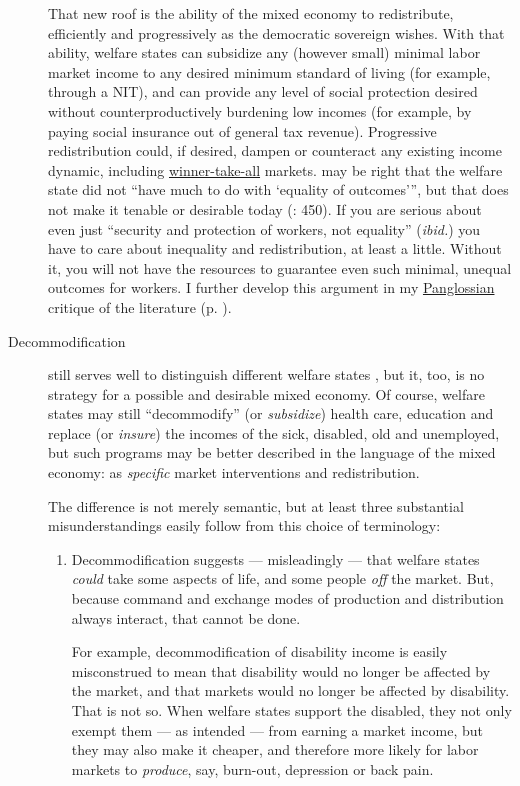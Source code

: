 \begin{description}
	That new roof is the ability of the mixed economy to redistribute, efficiently and progressively as the democratic sovereign wishes. With that ability, welfare states can subsidize any (however small) minimal labor market income to any desired minimum standard of living (for example, through a \gls{NIT}), and can provide any level of social protection desired without counterproductively burdening low incomes (for example, by paying social insurance out of general tax revenue). Progressive redistribution could, if desired, dampen or counteract any existing income dynamic, including \hyperref[sec:winner-take-all]{winner-take-all} markets. \citeauthor{Offe2003} may be right that the welfare state did not ``have much to do with `equality of outcomes''', but that does not make it tenable or desirable today (\citeyear{Offe2003}: 450). If you are serious about even just ``security and protection of workers, not equality'' (\emph{ibid.}) you have to care about inequality and redistribution, at least a little. Without it, you will not have the resources to guarantee even such minimal, unequal outcomes for workers. I further develop this argument  in my \hyperref[sec:Pangloss]{Panglossian} critique of the literature (p. \pageref{sec:Pangloss}).

	\item[Decommodification] still serves well to distinguish different welfare states \citep{Esping-Andersen-1990-aa}, but it, too, is no strategy for a possible and desirable mixed economy.  Of course, welfare states may still ``decommodify'' (or \emph{subsidize}) health care, education and replace (or \emph{insure}) the incomes of the sick, disabled, old and unemployed, but such programs may be better described in the language of the mixed economy: as \emph{specific} market interventions and redistribution. 
	
	The difference is not merely semantic, but at least three substantial misunderstandings easily follow from this choice of terminology:
	\begin{enumerate}
		\item Decommodification suggests --- misleadingly --- that welfare states \emph{could} take some aspects of life, and some people \emph{off} the market. But, because command and exchange modes of production and distribution always interact, that cannot be done. 
		
		For example, decommodification of disability income is easily misconstrued to mean that disability would no longer be affected by the market, and that markets would no longer be affected by disability. That is not so. When welfare states support the disabled, they not only exempt them --- as intended --- from earning a market income, but they may also make it cheaper, and therefore more likely for labor markets to \emph{produce}, say, burn-out, depression or back pain. 
		

\end{enumerate}
\end{description}

